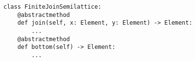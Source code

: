\begin{verbatim}
class FiniteJoinSemilattice:
    @abstractmethod
    def join(self, x: Element, y: Element) -> Element:
        ...
    @abstractmethod
    def bottom(self) -> Element:
        ...
\end{verbatim}